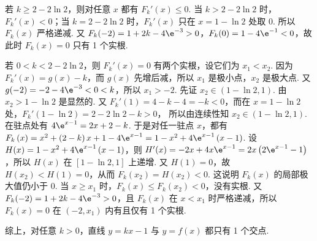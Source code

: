 \documentclass[UTF8,a4paper,oneside,11pt]{ctexbook}
\begin{document}
\begin{solution}
\begin{enumerate}
若 \( k\ge 2-2\ln 2 \)，则对任意 \( x \) 都有 \( F_k'(x)\le 0 \). 当 \( k>2-2\ln 2 \) 时，\( F_k'(x)<0 \)；当 \( k=2-2\ln 2 \) 时，\( F_k'(x) \) 只在 \( x=1-\ln 2 \) 处取 0. 所以 \( F_k(x) \) 严格递减. 又 \( F_k(-2)=1+2k-4\e^{-3}>0 \)，\( F_k(0)=1-4\e^{-1}<0 \)，故此时 \( F_k(x)=0 \) 只有 1 个实根.

若 \( 0<k<2-2\ln 2 \)，则 \( F_k'(x)=0 \) 有两个实根，设它们为 \( x_1<x_2 \). 因为 \( F_k'(x)=g(x)-k \)，而 \( g(x) \) 先增后减，所以 \( x_1 \) 是极小点，\( x_2 \) 是极大点. 又 \( g(-2)=-2-4\e^{-3}<0<k \)，所以 \( x_1>-2 \).
先证 \( x_2\in \left( 1-\ln 2,1 \right) \). 由 \( x_2>1-\ln 2 \) 是显然的. 又 \( F_k'(1)=4-k-4=-k<0 \)，而在 \( x=1-\ln 2 \) 处，\( F_k'\left( 1-\ln 2 \right)=2-2\ln 2-k>0 \)，
所以由连续性知 \( x_2\in \left( 1-\ln 2,1 \right) \).
在驻点处有 \( 4\e^{x-1}=2x+2-k \). 于是对任一驻点 \( x \)，都有 \( F_k\left( x \right)=x^2+\left( 2-k \right)x+1-4\e^{x-1}=1-x^2+4\e^{x-1}\left( x-1 \right) \).
设 \( H(x)=1-x^2+4\e^{x-1}\left( x-1 \right) \)，则 \( H'(x)=-2x+4x\e^{x-1}=2x\left( 2\e^{x-1}-1 \right) \)，所以 \( H(x) \) 在 \( \left[ 1-\ln 2,1 \right] \) 上递增. 又 \( H(1)=0 \)，故 \( H\left( x_2 \right)<H(1)=0 \)，从而 \( F_k\left( x_2 \right)=H\left( x_2 \right)<0 \).
这说明 \( F_k(x) \) 的局部极大值仍小于 0. 当 \( x\ge x_1 \) 时，\( F_k(x) \le F_k\left( x_2 \right)<0 \)，没有实根. 又 \( F_k(-2)=1+2k-4\e^{-3}>0 \)，且 \( F_k(x) \) 在 \( x<x_1 \) 时严格递减，所以 \( F_k(x)=0 \) 在 \( \left( -2,x_1 \right) \) 内有且仅有 1 个实根.

综上，对任意 \( k>0 \)，直线 \( y=kx-1 \) 与 \( y=f(x) \) 都只有 1 个交点.
\end{enumerate}
\end{solution}
\end{document}
